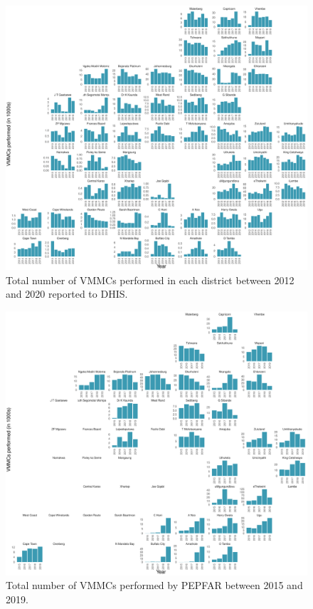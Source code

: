 \documentclass{article}
\begin{document}
\begin{appendix}
\begin{figure}[H]
	\centering
	\includegraphics[width = \linewidth]{Figures/suppmat/IDA/NumMMC_DHIS_District}
	\caption{Total number of VMMCs performed in each district between 2012 and 2020 reported to DHIS.}
\end{figure}


\begin{figure}[H]
	\centering
	\includegraphics[width = \linewidth]{Figures/suppmat/IDA/NumMMC_PEPFAR_District.pdf}
	\caption{Total number of VMMCs performed by PEPFAR between 2015 and 2019.}
\end{figure}


\end{appendix}
\end{document}
